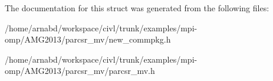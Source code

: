 The documentation for this struct was generated from the following files\+:\begin{DoxyCompactItemize}
\item 
/home/arnabd/workspace/civl/trunk/examples/mpi-\/omp/\+A\+M\+G2013/parcsr\+\_\+mv/new\+\_\+commpkg.\+h\item 
/home/arnabd/workspace/civl/trunk/examples/mpi-\/omp/\+A\+M\+G2013/parcsr\+\_\+mv/parcsr\+\_\+mv.\+h\end{DoxyCompactItemize}
